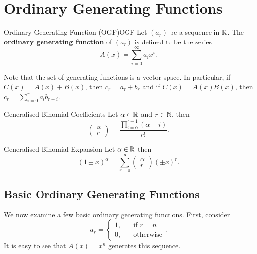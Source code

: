 \documentclass[math]{amznotes}
\theoremstyle{remark}
\begin{document}
\section{Ordinary Generating Functions}
\begin{dfnbox}{Ordinary Generating Function (OGF)}{OGF}
    Let $(a_r)$ be a sequence in $\mathbb{R}$. The {\color{red} \textbf{ordinary generating function}} of $(a_r)$ is defined to be the series
    \begin{equation*}
        A(x) = \sum_{i = 0}^{\infty}a_ix^i.
    \end{equation*}
\end{dfnbox}
Note that the set of generating functions is a vector space. In particular, if $C(x) = A(x) + B(x)$, then $c_r = a_r + b_r$ and if $C(x) = A(x)B(x)$, then $c_r = \sum_{i = 0}^{r}a_ib_{r - i}$.
\begin{dfnbox}{Generalised Binomial Coefficients}{}
    Let $\alpha \in \mathbb{R}$ and $r \in \mathbb{N}$, then 
    \begin{equation*}
        \begin{pmatrix}
            \alpha \\
            r
        \end{pmatrix} = \frac{\prod_{i = 0}^{r - 1}(\alpha - i)}{r!}.
    \end{equation*}
\end{dfnbox}

\begin{dfnbox}{Generalised Binomial Expansion}{}
    Let $\alpha \in \mathbb{R}$ then 
    \begin{equation*}
        (1 \pm x)^\alpha = \sum_{r = 0}^{\infty}\begin{pmatrix}
            \alpha \\
            r
        \end{pmatrix}(\pm x)^r.
    \end{equation*}
\end{dfnbox}
\subsection{Basic Ordinary Generating Functions}
We now examine a few basic ordinary generating functions. First, consider
\begin{equation*}
    a_r = \begin{cases}
        1, & \quad\textrm{if } r = n \\
        0, & \quad\textrm{otherwise}
    \end{cases}.
\end{equation*}
It is easy to see that $A(x) = x^n$ generates this sequence.
\end{document}
